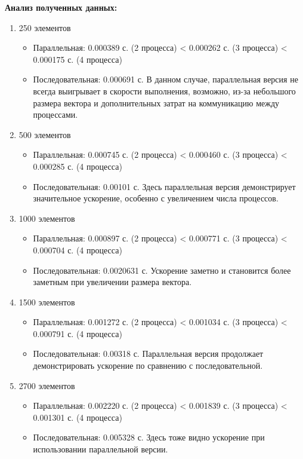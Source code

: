\documentclass[a4paper, 14pt]{article}
\theoremstyle{plain}
\begin{document}
\newpage
\textbf{Анализ полученных данных:}
\vspace{-0.65cm}
\begin{enumerate}[leftmargin=3em]
	\item 250 элементов
	\begin{itemize}
		\setlength\itemsep{0cm}
		\item Параллельная: 0.000389 с. (2 процесса) < 0.000262 с. (3 процесса) < 0.000175 с. (4 процесса)
		\item Последовательная: 0.000691 с.
		В данном случае, параллельная версия не всегда выигрывает в скорости выполнения, возможно, из-за небольшого размера вектора и дополнительных затрат на коммуникацию между процессами.
	\end{itemize}
	
	\item 500 элементов
	\begin{itemize}
		\setlength\itemsep{0cm}
		\item Параллельная: 0.000745 с. (2 процесса) < 0.000460 с. (3 процесса) < 0.000285 с. (4 процесса)
		\item Последовательная: 0.00101 с.
		Здесь параллельная версия демонстрирует значительное ускорение, особенно с увеличением числа процессов.
	\end{itemize}
	
	\item 1000 элементов
	\begin{itemize}
		\setlength\itemsep{0cm}
		\item Параллельная: 0.000897 с. (2 процесса) < 0.000771 с. (3 процесса) < 0.000704 с. (4 процесса)
		\item Последовательная: 0.0020631 с.
		Ускорение заметно и становится более заметным при увеличении размера вектора.
	\end{itemize}
	
	\item 1500 элементов
	\begin{itemize}
		\setlength\itemsep{0cm}
		\item Параллельная: 0.001272 с. (2 процесса) < 0.001034 с. (3 процесса) < 0.000791 с. (4 процесса)
		\item Последовательная: 0.00318 с.
		Параллельная версия продолжает демонстрировать ускорение по сравнению с последовательной.
	\end{itemize}
	
	\item 2700 элементов
	\begin{itemize}
		\setlength\itemsep{0cm}
		\item Параллельная: 0.002220 с. (2 процесса) < 0.001839 с. (3 процесса) < 0.001301 с. (4 процесса)
		\item Последовательная: 0.005328 с.
		Здесь тоже видно ускорение при использовании параллельной версии.
	\end{itemize}
\end{enumerate}
\end{document}
